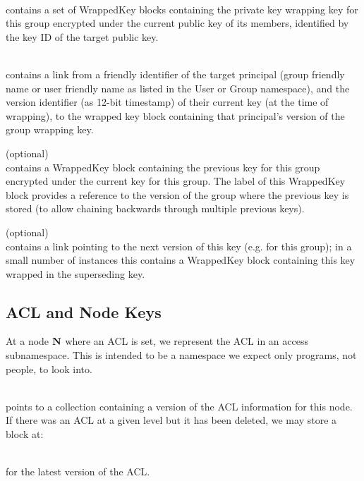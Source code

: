 \\
contains a set of WrappedKey blocks containing the private key
wrapping key for this group encrypted under the current public key of
its members, identified by the key ID of the target public key.

\\
contains a link from a friendly identifier of the target principal
(group friendly name or user friendly name as listed in the User or
Group namespace), and the version identifier (as 12-bit timestamp) of
their current key (at the time of wrapping), to the wrapped key block
containing that principal's version of the group wrapping key.

 (optional) \\
contains a WrappedKey block containing the previous key for this group
encrypted under the current key for this group. The label of this
WrappedKey block provides a reference to the version of the group
where the previous key is stored (to allow chaining backwards through
multiple previous keys).

 (optional) \\
contains a link pointing to the next version of this key (e.g. for
this group); in a small number of instances this contains a WrappedKey
block containing this key wrapped in the superseding key.


\subsection{ACL and Node Keys}

At a node ${\textbf{N}}$ where an ACL is set, we represent the ACL in an access
subnamespace. This is intended to be a namespace we expect only
programs, not people, to look into.

\\
points to a collection containing a version of the ACL information for
this node. If there was an ACL at a given level but it has been
deleted, we may store a block at:

\\
for the latest version of the ACL.

